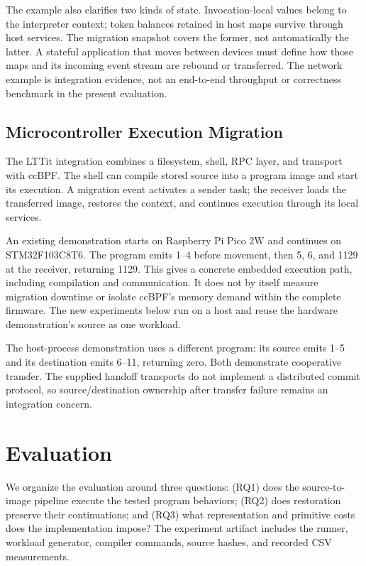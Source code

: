 \documentclass[conference,letterpaper]{IEEEtran}
\begin{document}
The example also clarifies two kinds of state. Invocation-local values belong to the interpreter context; token balances retained in host maps survive through host services. The migration snapshot covers the former, not automatically the latter. A stateful application that moves between devices must define how those maps and its incoming event stream are rebound or transferred. The network example is integration evidence, not an end-to-end throughput or correctness benchmark in the present evaluation.

\subsection{Microcontroller Execution Migration}
The LTTit integration combines a filesystem, shell, RPC layer, and transport with ccBPF. The shell can compile stored source into a program image and start its execution. A migration event activates a sender task; the receiver loads the transferred image, restores the context, and continues execution through its local services.

An existing demonstration starts on Raspberry Pi Pico 2W and continues on STM32F103C8T6. The program emits 1--4 before movement, then 5, 6, and 1129 at the receiver, returning 1129. This gives a concrete embedded execution path, including compilation and communication. It does not by itself measure migration downtime or isolate ccBPF's memory demand within the complete firmware. The new experiments below run on a host and reuse the hardware demonstration's source as one workload.

The host-process demonstration uses a different program: its source emits 1--5 and its destination emits 6--11, returning zero. Both demonstrate cooperative transfer. The supplied handoff transports do not implement a distributed commit protocol, so source/destination ownership after transfer failure remains an integration concern.

\section{Evaluation}
We organize the evaluation around three questions: (RQ1) does the source-to-image pipeline execute the tested program behaviors; (RQ2) does restoration preserve their continuations; and (RQ3) what representation and primitive costs does the implementation impose? The experiment artifact includes the runner, workload generator, compiler commands, source hashes, and recorded CSV measurements.
\end{document}
